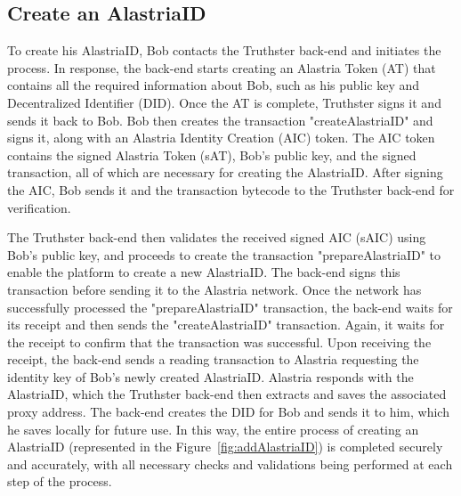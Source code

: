 \documentclass[target=mst,aauheader=]{thud}
\begin{document}
\subsection{Create an AlastriaID}

To create his AlastriaID, Bob contacts the Truthster back-end and initiates the process. In response, the back-end starts creating an Alastria Token (AT) that contains all the required information about Bob, such as his public key and Decentralized Identifier (DID). Once the AT is complete, Truthster signs it and sends it back to Bob. Bob then creates the transaction "createAlastriaID" and signs it, along with an Alastria Identity Creation (AIC) token. The AIC token contains the signed Alastria Token (sAT), Bob's public key, and the signed transaction, all of which are necessary for creating the AlastriaID. After signing the AIC, Bob sends it and the transaction bytecode to the Truthster back-end for verification.\par
The Truthster back-end then validates the received signed AIC (sAIC) using Bob's public key, and proceeds to create the transaction "prepareAlastriaID" to enable the platform to create a new AlastriaID. The back-end signs this transaction before sending it to the Alastria network. Once the network has successfully processed the "prepareAlastriaID" transaction, the back-end waits for its receipt and then sends the "createAlastriaID" transaction. Again, it waits for the receipt to confirm that the transaction was successful. Upon receiving the receipt, the back-end sends a reading transaction to Alastria requesting the identity key of Bob's newly created AlastriaID. Alastria responds with the AlastriaID, which the Truthster back-end then extracts and saves the associated proxy address. The back-end creates the DID for Bob and sends it to him, which he saves locally for future use. In this way, the entire process of creating an AlastriaID (represented in the Figure~\ref{fig:addAlastriaID}) is completed securely and accurately, with all necessary checks and validations being performed at each step of the process.
\end{document}
